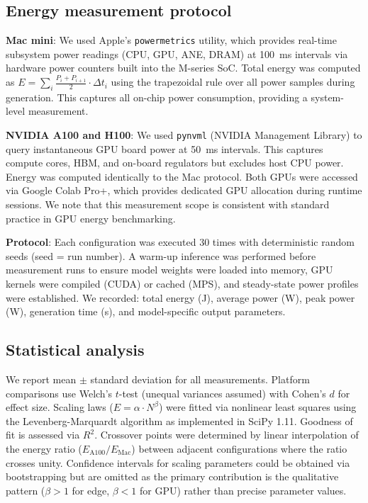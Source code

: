 \documentclass[11pt]{article}
\begin{document}
\subsection{Energy measurement protocol}

\textbf{Mac mini}: We used Apple's \texttt{powermetrics} utility, which provides real-time subsystem power readings (CPU, GPU, ANE, DRAM) at 100~ms intervals via hardware power counters built into the M-series SoC. Total energy was computed as $E = \sum_{i} \frac{P_i + P_{i+1}}{2} \cdot \Delta t_i$ using the trapezoidal rule over all power samples during generation. This captures all on-chip power consumption, providing a system-level measurement.

\textbf{NVIDIA A100 and H100}: We used \texttt{pynvml} (NVIDIA Management Library) to query instantaneous GPU board power at 50~ms intervals. This captures compute cores, HBM, and on-board regulators but excludes host CPU power. Energy was computed identically to the Mac protocol. Both GPUs were accessed via Google Colab Pro+, which provides dedicated GPU allocation during runtime sessions. We note that this measurement scope is consistent with standard practice in GPU energy benchmarking\cite{you2023zeus,samsi2023words,luccioni2024power}.

\textbf{Protocol}: Each configuration was executed 30 times with deterministic random seeds (seed = run number). A warm-up inference was performed before measurement runs to ensure model weights were loaded into memory, GPU kernels were compiled (CUDA) or cached (MPS), and steady-state power profiles were established. We recorded: total energy (J), average power (W), peak power (W), generation time (s), and model-specific output parameters.

\subsection{Statistical analysis}

We report mean $\pm$ standard deviation for all measurements. Platform comparisons use Welch's $t$-test (unequal variances assumed) with Cohen's $d$ for effect size. Scaling laws ($E = \alpha \cdot N^\beta$) were fitted via nonlinear least squares using the Levenberg-Marquardt algorithm as implemented in SciPy 1.11. Goodness of fit is assessed via $R^2$. Crossover points were determined by linear interpolation of the energy ratio ($E_\text{A100}/E_\text{Mac}$) between adjacent configurations where the ratio crosses unity. Confidence intervals for scaling parameters could be obtained via bootstrapping but are omitted as the primary contribution is the qualitative pattern ($\beta > 1$ for edge, $\beta < 1$ for GPU) rather than precise parameter values.
\end{document}
